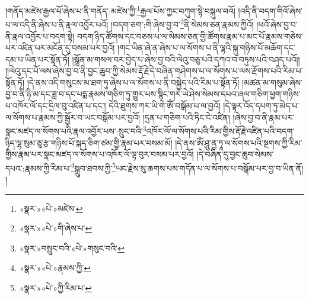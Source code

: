 །གནོད་མཛེས་རྒྱལ་པོ་ཞེས་པ་ནི་གནོད་:མཛེས་ཀྱི་\footnote{«སྣར་»«པེ་»མཛེས་}རྒྱལ་པོས་ཀྱང་བཀུག་སྟེ་བསྐུལ་བའོ། །འདི་ནི་བདག་གིའོ་ཞེས་པ་ལ་འདི་ནི་ཞེས་པ་ནི་རྣལ་འབྱོར་པའོ། །བདག་ཅག་:གི་ཞེས་བྱ་བ་\footnote{«སྣར་»«པེ་»གི་ཞེས་པ་}ནི་སེམས་ཅན་རྣམས་ཀྱིའོ། །ཕའོ་ཞེས་བྱ་བ་ནི་རྣལ་འབྱོར་པ་བདག་སྟེ། བདག་ཉིད་ཚོགས་དང་བཅས་པ་ལ་སེམས་ཅན་གྱི་ཚོགས་རྣམ་པ་མང་པོ་རྣམས་གཅེས་པར་འཛིན་པར་མངོན་དུ་བསམ་པར་བྱའོ། །གང་ཡིན་ཞེ་ན་ཞེས་པ་ལ་སོགས་པ་ནི་ལྷའི་སྐུ་གཉིས་པོ་མཆོག་དང་དམ་པ་ཡིན་པར་སྟོན་ཏོ། །སྒྲོན་མ་གསལ་བར་བྱེད་པ་ཞེས་བྱ་བའི་ལེའུ་བཅུ་པའི་དཀའ་བ་བཏུས་པའི་བཤད་པའོ།། །།ལེའུ་དང་པོ་ལས་ཞེས་བྱ་བ་ནི་བྱང་ཆུབ་ཀྱི་སེམས་རྡོ་རྗེ་དེ་བཞིན་གཤེགས་པ་ལ་སོགས་པ་ལས་རྫོགས་པའི་རིམ་པ་སྟོན་ཏོ། །དེ་ནས་འདི་གསུངས་མ་ཐག་ཏུ་ཞེས་པ་ལ་སོགས་པ་ནི་བསྐྱེད་པའི་རིམ་པ་སྟོན་ཏོ། །མཚན་མ་གསུམ་ཞེས་བྱ་བ་ནི་ཉི་མ་དང་ཟླ་བ་དང་པདྨ་རྣམས་གཅིག་ཏུ་གྱུར་པས་སྙིང་གར་ཡེ་ཤེས་སེམས་དཔའ་ཞལ་གཅིག་ཕྱག་གཉིས་པ་འཁོར་ལོ་དང་དྲིལ་བུ་འཛིན་པ་དང་། དེའི་ཐུགས་ཀར་ཡི་གེ་ཨོཾ་བསྒོམ་པ་ལ་བྱའོ། །དེ་ལྟར་འོད་དཔག་ཏུ་མེད་པ་ལ་སོགས་པ་རྣམས་ཀྱི་སྦྱོར་བ་ཡང་བསྒོམ་པར་བྱའོ། །དྲན་པ་གཅིག་པའི་ཏིང་ངེ་འཛིན། །ཞེས་བྱ་བ་ནི་རྣམ་པར་སྣང་མཛད་ལ་སོགས་པའི་རྣལ་འབྱོར་པས་:སྲུང་བའི་\footnote{«སྣར་»བསྲུང་བའི་«པེ་»གསུང་བའི་}འཁོར་ལོ་ལ་སོགས་པའི་རིམ་གྱིས་རྡོ་རྗེ་འཛིན་པའི་བདག་ཉིད་ལྷ་སུམ་ཅུ་རྩ་གཉིས་པོ་སྐད་ཅིག་ཙམ་གྱི་རྣམ་པར་བསམ་མོ། །དེ་ནས་ཨོཾ་ཤཱུ་ནྱ་ཏཱ་ལ་སོགས་པའི་སྔགས་ཀྱི་རིམ་གྱིས་རྣམ་པར་སྣང་མཛད་ལ་སོགས་པ་འཁོར་ལོ་ལྟ་བུར་བསམ་པར་བྱའོ། །དེ་བཞིན་དུ་བྱང་ཆུབ་སེམས་དཔའ་:རྣམས་ཀྱི་རིམ་པ་\footnote{«སྣར་»«པེ་»རྣམས་ཀྱི་}སྒྲུབ་ཐབས་ཀྱི་\footnote{«སྣར་»«པེ་»ཀྱི་རིམ་པ་}ཡང་རྗེས་སུ་ཆགས་པས་གདོན་པ་ལ་སོགས་པ་བསྒོམ་པར་བྱ་བ་ཡིན་ནོ། །
